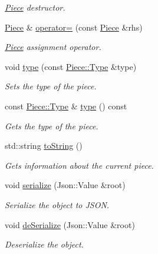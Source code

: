 \begin{DoxyCompactItemize}
\begin{DoxyCompactList}\small\item\em \hyperlink{class_piece}{Piece} destructor. \end{DoxyCompactList}\item 
\hyperlink{class_piece}{Piece} \& \hyperlink{class_piece_a8b059420684d0bf0ed7cde80b42a6286}{operator=} (const \hyperlink{class_piece}{Piece} \&rhs)
\begin{DoxyCompactList}\small\item\em \hyperlink{class_piece}{Piece} assignment operator. \end{DoxyCompactList}\item 
void \hyperlink{class_piece_ad41386c09d8ca34799398a2c11036cce}{type} (const \hyperlink{class_piece_abcd044975b3657962abfd2ded9194b09}{Piece\-::\-Type} \&type)
\begin{DoxyCompactList}\small\item\em Sets the type of the piece. \end{DoxyCompactList}\item 
const \hyperlink{class_piece_abcd044975b3657962abfd2ded9194b09}{Piece\-::\-Type} \& \hyperlink{class_piece_a64d970cf7c3d34014d8a36cc3bd3c908}{type} () const 
\begin{DoxyCompactList}\small\item\em Gets the type of the piece. \end{DoxyCompactList}\item 
std\-::string \hyperlink{class_piece_ae18523c400cb72a50bb1293d27cd1432}{to\-String} ()
\begin{DoxyCompactList}\small\item\em Gets information about the current piece. \end{DoxyCompactList}\item 
\hypertarget{class_piece_ae2397428f87d0303ede94fa91fef5ea5}{void \hyperlink{class_piece_ae2397428f87d0303ede94fa91fef5ea5}{serialize} (Json\-::\-Value \&root)}\label{class_piece_ae2397428f87d0303ede94fa91fef5ea5}

\begin{DoxyCompactList}\small\item\em Serialize the object to J\-S\-O\-N. \end{DoxyCompactList}\item 
\hypertarget{class_piece_a51f5d80dc3584e372d356ebfc281a886}{void \hyperlink{class_piece_a51f5d80dc3584e372d356ebfc281a886}{de\-Serialize} (Json\-::\-Value \&root)}\label{class_piece_a51f5d80dc3584e372d356ebfc281a886}

\begin{DoxyCompactList}\small\item\em Deserialize the object. \end{DoxyCompactList}\end{DoxyCompactItemize}
